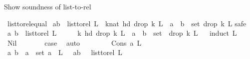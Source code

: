 \begin{isabellebody}
%
\endisatagproof
{\isafoldproof}%
%
\isadelimproof
%
\endisadelimproof
%
\begin{isamarkuptext}%
Show soundness of list-to-rel%
\end{isamarkuptext}\isamarkuptrue%
\isamarkupfalse%
\ list{\isacharunderscore}{\kern0pt}to{\isacharunderscore}{\kern0pt}rel{\isacharunderscore}{\kern0pt}equal{\isacharcolon}{\kern0pt}\ \isanewline
{\isachardoublequoteopen}{\isacharparenleft}{\kern0pt}a{\isacharcomma}{\kern0pt}b{\isacharparenright}{\kern0pt}\ {\isasymin}\ list{\isacharunderscore}{\kern0pt}to{\isacharunderscore}{\kern0pt}rel\ L\ {\isasymlongleftrightarrow}\ {\isacharparenleft}{\kern0pt}{\isasymexists}k{\isacharcolon}{\kern0pt}{\isacharcolon}{\kern0pt}nat{\isachardot}{\kern0pt}\ hd\ {\isacharparenleft}{\kern0pt}drop\ k\ L{\isacharparenright}{\kern0pt}\ {\isacharequal}{\kern0pt}\ a\ {\isasymand}\ b\ {\isasymin}\ set\ {\isacharparenleft}{\kern0pt}drop\ k\ L{\isacharparenright}{\kern0pt}{\isacharparenright}{\kern0pt}{\isachardoublequoteclose}\isanewline
%
\isadelimproof
%
\endisadelimproof
%
\isatagproof
{}\isamarkupfalse%
{\isacharparenleft}{\kern0pt}safe{\isacharparenright}{\kern0pt}\isanewline
\ \ \isamarkupfalse%
\ {\isachardoublequoteopen}{\isacharparenleft}{\kern0pt}a{\isacharcomma}{\kern0pt}\ b{\isacharparenright}{\kern0pt}\ {\isasymin}\ list{\isacharunderscore}{\kern0pt}to{\isacharunderscore}{\kern0pt}rel\ L{\isachardoublequoteclose}\isanewline
\ \ \isamarkupfalse%
\ \isamarkupfalse%
\ {\isachardoublequoteopen}{\isasymexists}k{\isachardot}{\kern0pt}\ hd\ {\isacharparenleft}{\kern0pt}drop\ k\ L{\isacharparenright}{\kern0pt}\ {\isacharequal}{\kern0pt}\ a\ {\isasymand}\ b\ {\isasymin}\ set\ \ {\isacharparenleft}{\kern0pt}drop\ k\ L{\isacharparenright}{\kern0pt}{\isachardoublequoteclose}\isanewline
\ \ \isamarkupfalse%
{\isacharparenleft}{\kern0pt}induct\ L{\isacharparenright}{\kern0pt}\isanewline
\ \ \ \ \isamarkupfalse%
\ Nil\isanewline
\ \ \ \ \isamarkupfalse%
\ \isamarkupfalse%
\ {\isacharquery}{\kern0pt}case\ \isamarkupfalse%
\ auto\isanewline
\ \ \isamarkupfalse%
\isanewline
\ \ \ \ \isamarkupfalse%
\ {\isacharparenleft}{\kern0pt}Cons\ a{}\ L{\isacharparenright}{\kern0pt}\isanewline
\ \ \ \ \isamarkupfalse%
\ \isamarkupfalse%
\ {\isachardoublequoteopen}{\isacharparenleft}{\kern0pt}a{\isacharcomma}{\kern0pt}\ b{\isacharparenright}{\kern0pt}\ {\isasymin}\ {\isacharbraceleft}{\kern0pt}a{}{\isacharbraceright}{\kern0pt}\ {\isasymtimes}\ set\ {\isacharparenleft}{\kern0pt}a{}\ {\isacharhash}{\kern0pt}\ L{\isacharparenright}{\kern0pt}\ {\isachardoublequoteclose}\ {\isacharbar}{\kern0pt}\ {\isachardoublequoteopen}{\isacharparenleft}{\kern0pt}a{\isacharcomma}{\kern0pt}b{\isacharparenright}{\kern0pt}\ {\isasymin}\ \ list{\isacharunderscore}{\kern0pt}to{\isacharunderscore}{\kern0pt}rel\ L{\isachardoublequoteclose}\ \isamarkupfalse%

\end{isabellebody}
